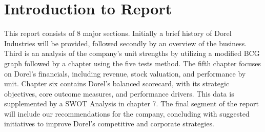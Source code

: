 
\begingroup


\chapter*{Introduction to Report}


This report consists of 8 major sections.  Initially a brief history of Dorel Industries will be provided, followed secondly by an overview of the business.  Third is an analysis of the company's unit strengths by utilizing a modified BCG graph followed by a chapter using the five tests method.  The fifth chapter focuses on Dorel's financials, including revenue, stock valuation, and performance by unit.  Chapter six contains Dorel's balanced scorecard, with its strategic objectives, core outcome measures, and performance drivers.  This data is supplemented by a SWOT Analysis in chapter 7.   The final segment of the report will include our recommendations for the company, concluding with suggested initiatives to improve Dorel’s competitive and corporate strategies.


\endgroup



